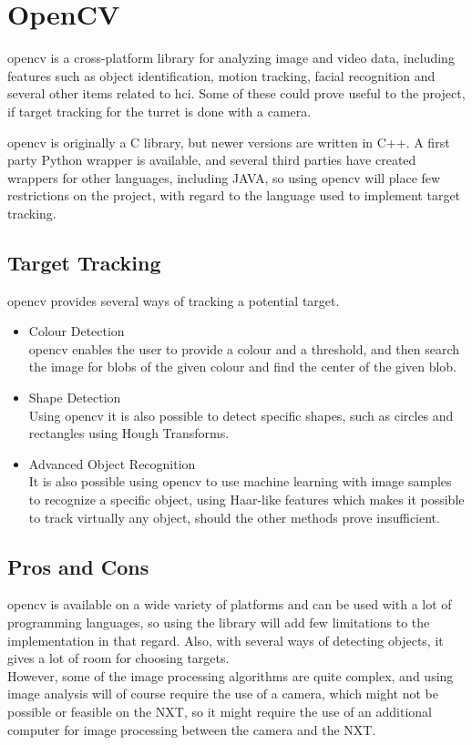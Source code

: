 \section{OpenCV}

\ac{opencv}\cite{opencv} is a cross-platform library for analyzing image and video data, including features such
as object identification, motion tracking, facial recognition and several other items related to \ac{hci}. 
Some of these could prove useful to the project, if target tracking for the turret is done with a camera.

\ac{opencv} is originally a C library, but newer versions are written in C++. A first party Python wrapper is
available, and several third parties have created wrappers for other languages, including JAVA\cite{javacv}, so
using \ac{opencv} will place few restrictions on the project, with regard to the language used to implement
target tracking.

\subsection{Target Tracking}
\ac{opencv} provides several ways of tracking a potential target.
\begin{itemize}
  \item{Colour Detection}\\
  \ac{opencv} enables the user to provide a colour and a threshold, and then search the image for blobs of the
  given colour and find the center of the given blob.
  \item{Shape Detection}\\
  Using \ac{opencv} it is also possible to detect specific shapes, such as circles and rectangles using
  Hough Transforms\cite{hough2003}.
  \item{Advanced Object Recognition}\\
  It is also possible using \ac{opencv} to use machine learning with image samples to recognize a specific
  object, using Haar-like features\cite{lienhart2002} which makes it possible to track virtually any object,
  should the other methods prove insufficient.
\end{itemize}

\subsection{Pros and Cons}
\ac{opencv} is available on a wide variety of platforms and can be used with a lot of programming languages,
so using the library will add few limitations to the implementation in that regard. Also, with several ways
of detecting objects, it gives a lot of room for choosing targets.\\
However, some of the image processing algorithms are quite complex, and using image analysis will of course
require the use of a camera, which might not be possible or feasible on the NXT, so it might require the
use of an additional computer for image processing between the camera and the NXT.
